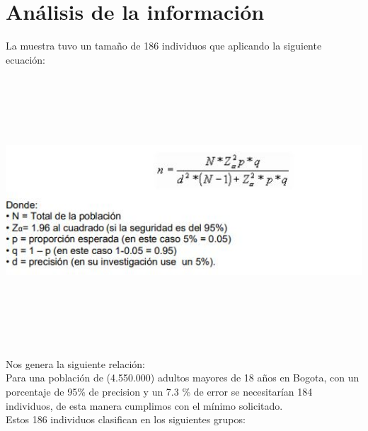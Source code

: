 \newpage
\section{Análisis de la información}

La muestra tuvo un tamaño de 186 individuos que aplicando la siguiente ecuación:
\begin{center}
\includegraphics[width=16cm, height=10cm,keepaspectratio=true]{Desarrollo/RecoleccionInformacion/imgs/muestra.JPG}
\end{center}
Nos genera la siguiente relación:\\ 
Para una población de (4.550.000) adultos mayores de 18 años en Bogota, con un porcentaje de 95\% de precision y un 7.3 \%  de error  se necesitarían 184 individuos, de esta manera cumplimos con el mínimo solicitado.\\
Estos 186 individuos clasifican en los siguientes grupos:\\
